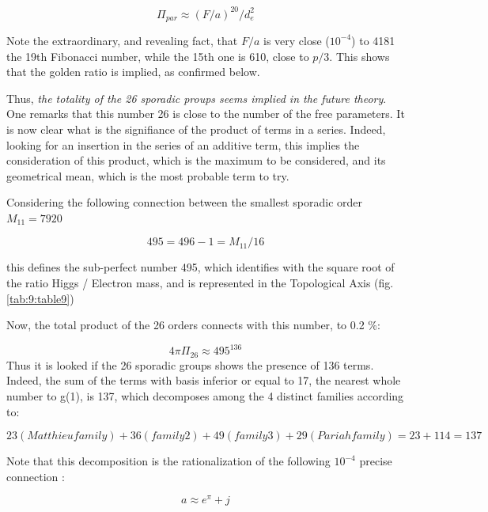 \documentclass[a4paper,9pt]{article}
\begin{document}
\begin{equation}
\Pi_{par} \approx (F/a)^{20}/d_e^2
\end{equation}

Note the extraordinary, and revealing fact, that $F/a$ is very close ($10^{-4}$) to 4181 the 19th Fibonacci number, while the 15th one is 610, close to $p/3$. This shows that the golden ratio is implied, as confirmed below.
 

Thus, \textit{the totality of the 26 sporadic proups seems implied in the future theory}. One remarks that this number 26 is close to the number of the free parameters. It is now clear what is the signifiance of the product of terms in a series. Indeed, looking for an insertion in the series of an additive term, this implies the consideration of this product, which is the maximum to be considered, and its geometrical mean, which is the most probable term to try.

Considering the following connection between the smallest sporadic order $ M_{11} = 7920$

\begin{equation}
495 = 496 -1 = M_{11}/16
\end{equation}

this defines the sub-perfect number 495, which identifies with the square root of the ratio Higgs / Electron mass, and is represented in the Topological Axis (fig. \ref{tab:9:table9})

Now, the total product of the 26 orders connects with this number, to 0.2 \%:

\begin{equation}
4\pi \Pi_{26} \approx 495^{136}
\end{equation}
Thus it is looked if the 26 sporadic groups shows the presence of 136 terms. Indeed, the sum of the terms with basis inferior or equal to 17, the nearest whole number to g(1), is 137, which decomposes among the 4 distinct families according to:





\begin{equation}
23 (Matthieu family) + 36 (family 2) + 49 (family 3) + 29 (Pariah family) = 23 + 114 = 137 
\end{equation}

Note that this decomposition is the rationalization of the following $10^{-4} $ precise connection \cite{Sanchez}:


\begin{equation}
a \approx e^{\pi} + j   
\end{equation}
\end{document}
